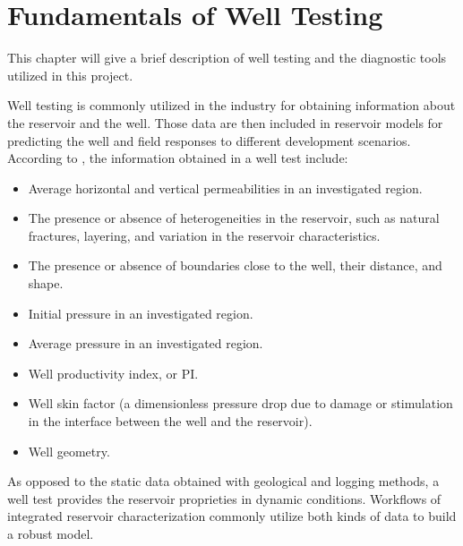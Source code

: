 \chapter{Fundamentals of Well Testing}
\label{wellTesting}
This chapter will give a brief description of well testing and the diagnostic tools utilized in this project.

Well testing is commonly utilized in the industry for obtaining information about the reservoir and the well. Those data are then included in reservoir models for predicting the well and field responses to different development scenarios. According to \cite{Bourdet2002}, the information obtained in a well test include:

\begin{itemize}
\item  Average horizontal and vertical permeabilities in an investigated region.
\item The presence or absence of heterogeneities in the reservoir, such as natural fractures, layering, and variation in the reservoir characteristics.
\item The presence or absence of boundaries close to the well, their distance, and shape.
\item Initial pressure in an investigated region.
\item Average pressure in an investigated region.
\item Well productivity index, or PI.
\item Well skin factor (a dimensionless pressure drop due to damage or stimulation in the interface between the well and the reservoir).
\item Well geometry.
\end{itemize}

As opposed to the static data obtained with geological and logging methods, a well test provides the reservoir proprieties in dynamic conditions. Workflows of integrated reservoir characterization commonly utilize both kinds of data to build a robust model.

